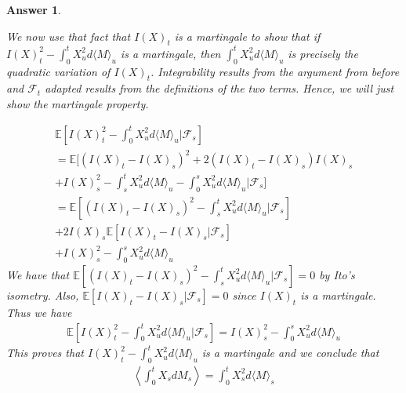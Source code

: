 \documentclass[12pt]{article}
\theoremstyle{colon}
\newtheorem*{answer}{Answer}
\begin{document}
\begin{answer}
\begin{enumerate}[label=\alph*)]
      We now use that fact that $I(X)_t$ is a martingale to show that if $I(X)_t^2 - \int_0^t X_u^2 d \langle M \rangle_u$ is a martingale, then $\int_0^t X_u^2 d \langle M \rangle_u$ is precisely the quadratic variation of $I(X)_t$. Integrability results from the argument from before and $\mathcal{F}_t$ adapted results from the definitions of the two terms. Hence, we will just show the martingale property.

      \begin{gather*}
        \mathbb{E}[ I(X)_t^2 - \int_0^t X_u^2 d \langle M \rangle_u | \mathcal{F}_s ] \\
        = \mathbb{E}[ (I(X)_t - I(X)_s)^2 + 2(I(X)_t - I(X)_s)I(X)_s \\
        + I(X)_s^2 - \int_s^t X_u^2 d \langle M \rangle_u - \int_0^s X_u^2 d \langle M \rangle_u| \mathcal{F}_s ] \\
        = \mathbb{E}[ (I(X)_t - I(X)_s)^2 - \int_s^t X_u^2 d \langle M \rangle_u | \mathcal{F}_s ] \\
        + 2I(X)_s \mathbb{E}[I(X)_t - I(X)_s | \mathcal{F}_s] \\
        + I(X)_s^2 - \int_0^s X_u^2 d \langle M \rangle_u
      \end{gather*}
      We have that $\mathbb{E}[ (I(X)_t - I(X)_s)^2 - \int_s^t X_u^2 d \langle M \rangle_u | \mathcal{F}_s ] = 0$ by Ito's isometry. Also, $\mathbb{E}[I(X)_t - I(X)_s | \mathcal{F}_s] = 0$ since $I(X)_t$ is a martingale. Thus we have
      \begin{gather*}
        \mathbb{E}[ I(X)_t^2 - \int_0^t X_u^2 d \langle M \rangle_u | \mathcal{F}_s ] = I(X)_s^2 - \int_0^s X_u^2 d \langle M \rangle_u
      \end{gather*}
      This proves that $I(X)_t^2 - \int_0^t X_u^2 d \langle M \rangle_u$ is a martingale and we conclude that
      \begin{gather*}
        \left \langle \int_0^t X_s d M_s \right \rangle = \int_0^t X_s^2 d \langle M \rangle_s
      \end{gather*}


\end{enumerate}
\end{answer}
\end{document}
